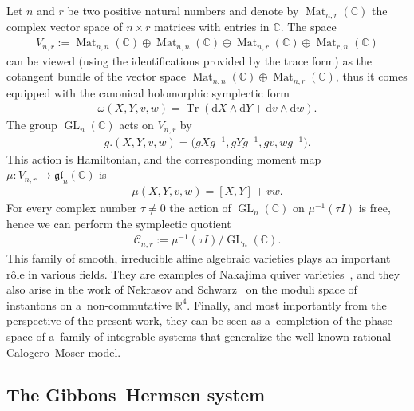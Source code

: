 \documentclass[pdftex]{sigma}
\newcommand{\bb}[1]{\mathbb{#1}}
\newcommand{\app}[3]{#1\colon #2\to #3}
\DeclareMathOperator{\tr}{Tr}
\DeclareMathOperator{\GL}{GL}
\DeclareMathOperator{\Mat}{Mat}
\begin{document}
Let \(n\) and \(r\) be two positive natural numbers and denote by \(\Mat_{n,r}(\bb{C})\) the complex vector
space of \(n\times r\) matrices with entries in \(\bb{C}\).
The space
\begin{gather*}
V_{n,r}\mathrel{:=}\Mat_{n,n}(\bb{C})\oplus\Mat_{n,n}(\bb{C})\oplus\Mat_{n,r}(\bb{C})\oplus\Mat_{r,n}(\bb{C})
\end{gather*}
can be viewed (using the identif\/ications provided by the trace form) as the cotangent bundle of the
vector space \(\Mat_{n,n}(\bb{C})\oplus \Mat_{n,r}(\bb{C})\), thus it comes equipped with the canonical
holomorphic symplectic form
\begin{gather}
\omega(X,Y,v,w)=\tr(\mathrm{d}X\wedge\mathrm{d}Y+\mathrm{d}v\wedge\mathrm{d}w).
\label{eq:ss}
\end{gather}
The group \(\GL_{n}(\bb{C})\) acts on \(V_{n,r}\) by
\begin{gather}
\label{eq:az}
g.(X,Y,v,w)=\big(gXg^{-1},gYg^{-1},gv,wg^{-1}\big).
\end{gather}
This action is Hamiltonian, and the corresponding moment map
\(\app{\mu}{V_{n,r}}{\mathfrak{gl}_{n}(\bb{C})}\) is
\begin{gather}
\label{eq:mom-mu}
\mu(X,Y,v,w)=[X,Y]+vw.
\end{gather}
For every complex number \(\tau\neq 0\) the action of \(\GL_{n}(\bb{C})\) on \(\mu^{-1}(\tau I)\) is free,
hence we can perform the symplectic quotient
\begin{gather}
\label{eq:Cnr}
\mathcal{C}_{n,r}\mathrel{:=}\mu^{-1}(\tau I)/\GL_{n}(\bb{C}).
\end{gather}
This family of smooth, irreducible af\/f\/ine algebraic varieties plays an important r\^ole in various
f\/ields.
They are examples of Nakajima quiver varieties~\cite{naka94}, and they also arise in the work of Nekrasov
and Schwarz~\cite{ns98} on the moduli space of instantons on a~non-commutative \(\bb{R}^{4}\).
Finally, and most importantly from the perspective of the present work, they can be seen as a~completion of
the phase space of a~family of integrable systems that generalize the well-known rational Calogero--Moser
model.

\subsection[The Gibbons-Hermsen system]{The Gibbons--Hermsen system}
\end{document}
